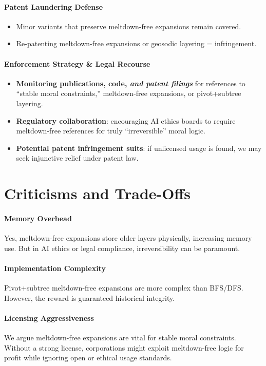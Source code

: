 \documentclass[acmsmall]{acmart}
\theoremstyle{definition}
\theoremstyle{remark}
\begin{document}
\paragraph{Patent Laundering Defense}
\begin{itemize}[leftmargin=*]
  \item Minor variants that preserve meltdown-free expansions remain covered.
  \item Re-patenting meltdown-free expansions or geosodic layering = infringement.
\end{itemize}

\paragraph{Enforcement Strategy \& Legal Recourse}
\begin{itemize}[leftmargin=*]
  \item \textbf{Monitoring publications, code, \emph{and patent filings}} for 
        references to “stable moral constraints,” meltdown-free expansions, or 
        pivot+subtree layering.
  \item \textbf{Regulatory collaboration}: encouraging AI ethics boards to require meltdown-free
        references for truly “irreversible” moral logic.
  \item \textbf{Potential patent infringement suits}: if unlicensed usage is found, 
        we may seek injunctive relief under patent law.
\end{itemize}

\section{Criticisms and Trade-Offs}
\label{sec:criticisms}

\paragraph{Memory Overhead}
Yes, meltdown-free expansions store older layers physically, increasing memory use.
But in AI ethics or legal compliance, irreversibility can be paramount.

\paragraph{Implementation Complexity}
Pivot+subtree meltdown-free expansions are more complex than BFS/DFS. However,
the reward is guaranteed historical integrity.

\paragraph{Licensing Aggressiveness}
We argue meltdown-free expansions are vital for stable moral constraints. Without
a strong license, corporations might exploit meltdown-free logic for profit
while ignoring open or ethical usage standards.
\end{document}
